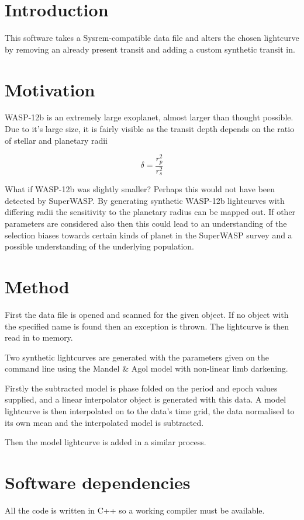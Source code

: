 \hypertarget{index_Introduction}{}\section{Introduction}\label{index_Introduction}
This software takes a Sysrem-\/compatible data file and alters the chosen lightcurve by removing an already present transit and adding a custom synthetic transit in.\hypertarget{index_Motivation}{}\section{Motivation}\label{index_Motivation}
WASP-\/12b is an extremely large exoplanet, almost larger than thought possible. Due to it's large size, it is fairly visible as the transit depth depends on the ratio of stellar and planetary radii

\[ \delta = \frac{r_p^2}{r_s^2} \]

What if WASP-\/12b was slightly smaller? Perhaps this would not have been detected by SuperWASP. By generating synthetic WASP-\/12b lightcurves with differing radii the sensitivity to the planetary radius can be mapped out. If other parameters are considered also then this could lead to an understanding of the selection biases towards certain kinds of planet in the SuperWASP survey and a possible understanding of the underlying population.\hypertarget{index_Method}{}\section{Method}\label{index_Method}
First the data file is opened and scanned for the given object. If no object with the specified name is found then an exception is thrown. The lightcurve is then read in to memory.

Two synthetic lightcurves are generated with the parameters given on the command line using the Mandel \& Agol model with non-\/linear limb darkening.

Firstly the subtracted model is phase folded on the period and epoch values supplied, and a linear interpolator object is generated with this data. A model lightcurve is then interpolated on to the data's time grid, the data normalised to its own mean and the interpolated model is subtracted.

Then the model lightcurve is added in a similar process.\hypertarget{index_dependencies}{}\section{Software dependencies}\label{index_dependencies}
All the code is written in C++ so a working compiler must be available.

